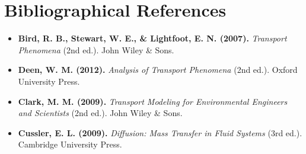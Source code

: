\newpage
\section{Bibliographical References}
\label{sec:references}

\begin{itemize}
    \item \textbf{Bird, R. B., Stewart, W. E., \& Lightfoot, E. N. (2007).} \emph{Transport Phenomena} (2nd ed.). John Wiley \& Sons.  
    \item \textbf{Deen, W. M. (2012).} \emph{Analysis of Transport Phenomena} (2nd ed.). Oxford University Press.  

    \item \textbf{Clark, M. M. (2009).} \emph{Transport Modeling for Environmental Engineers and Scientists} (2nd ed.). John Wiley \& Sons.  
    \item \textbf{Cussler, E. L. (2009).} \emph{Diffusion: Mass Transfer in Fluid Systems} (3rd ed.). Cambridge University Press.  


\end{itemize}
